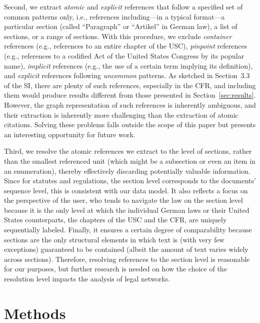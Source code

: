 \documentclass[utf8,sort&compress,table,hidelinks]{frontiersFPHY} %
\newcommand{\thesi}{SI\xspace}
\begin{document}
Second, we extract \emph{atomic} and \emph{explicit} references that follow a specified set of common patterns only, i.e., references including---in a typical format---a particular section (called ``Paragraph'' or ``Artikel'' in German law), a list of sections, or a range of sections.
With this procedure, we exclude \emph{container} references (e.g., references to an entire chapter of the USC), \emph{pinpoint} references (e.g., references to a codified Act of the United States Congress by its popular name), \emph{implicit} references (e.g., the use of a certain term implying its definition), and \emph{explicit} references following \emph{uncommon} patterns.
As sketched in Section~3.3 of the \thesi, there are plenty of such references, especially in the CFR, and including them would produce results different from those presented in Section~\ref{sec:results}.
However, the graph representation of such references is inherently ambiguous, 
and their extraction is inherently more challenging than the extraction of atomic citations.
Solving these problems falls outside the scope of this paper but presents an interesting opportunity for future work.

Third, we resolve the atomic references we extract to the level of sections, rather than the smallest referenced unit (which might be a subsection or even an item in an enumeration), thereby effectively discarding potentially valuable information.
Since for statutes and regulations, the section level corresponds to the documents' sequence level, this is consistent with our data model.
It also reflects a focus on the perspective of the user, who tends to navigate the law on the section level because it is the only level at which the individual German laws or their United States counterparts, the chapters of the USC and the CFR, are uniquely sequentially labeled. 
Finally, it ensures a certain degree of comparability because sections are the only structural elements in which text is (with very few exceptions) guaranteed to be contained (albeit the amount of text varies widely across sections).
Therefore, resolving references to the section level is reasonable for our purposes, but further research is needed on how the choice of the resolution level impacts the analysis of legal networks.


\section{Methods}
\label{sec:methods}
\end{document}
